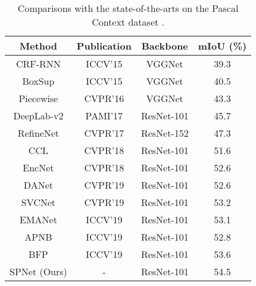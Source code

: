 \documentclass[final]{cvpr}
\begin{document}
\begin{table}[t]
  \centering
  \small
  \setlength\tabcolsep{2.5mm}
  \begin{tabular}{cccc} \toprule[0.7pt]
    Method & Publication & Backbone & mIoU (\%) \\ \midrule[0.5pt] \midrule[0.5pt]
CRF-RNN \cite{zheng2015conditional} & ICCV'15 & VGGNet & 39.3 \\
    BoxSup \cite{dai2015boxsup}  & ICCV'15 & VGGNet & 40.5 \\
    Piecewise \cite{lin2016efficient}  & CVPR'16 & VGGNet & 43.3 \\
DeepLab-v2 \cite{chen2017deeplab} & PAMI'17 & ResNet-101 & 45.7 \\
    RefineNet \cite{lin2017refinenet} & CVPR'17 & ResNet-152 & 47.3 \\
CCL \cite{zhang2018context}  & CVPR'18 & ResNet-101& 51.6  \\
    EncNet \cite{zhang2018context}  & CVPR'18 & ResNet-101 & 52.6  \\
    DANet \cite{fu2019dual} & CVPR'19 & ResNet-101 & 52.6 \\
    SVCNet \cite{ding2019semantic} & CVPR'19 & ResNet-101 & 53.2 \\
    EMANet \cite{li2019expectation}  & ICCV'19 & ResNet-101 & 53.1  \\
    APNB \cite{zhu2019asymmetric}  & ICCV'19 & ResNet-101 & 52.8  \\
    BFP \cite{ding2019boundary}  & ICCV'19 & ResNet-101 & 53.6  \\ \midrule[0.5pt] \midrule[0.5pt]
SPNet (Ours) & - & ResNet-101 & 54.5 \\
\bottomrule[0.7pt]
\end{tabular}
  \vspace{0pt}
  \caption{Comparisons with the state-of-the-arts on the Pascal Context dataset \cite{mottaghi2014role}.}
  \label{tab:res_context}
\end{table}
\end{document}
